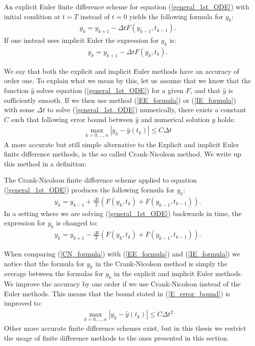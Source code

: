 \begin{definition} \label{Euler_adjoint_def}
An explicit Euler finite difference scheme for equation (\ref{general_1st_ODE}) with initial condition at $t=T$ instead of $t=0$ yields the following formula for $y_k$:
\begin{align}
y_k = y_{k+1} -\Delta tF(y_{k-1},t_{k-1}).\label{EE_adjoint_formula}
\end{align} 
If one instead uses implicit Euler the expression for $y_k$ is:
\begin{align}
y_k = y_{k+1} -\Delta tF(y_{k},t_{k}). \label{IE_adjoint_formula}
\end{align}
\end{definition}
\noindent
We say that both the explicit and implicit Euler methods have an accuracy of order one. To explain what we mean by this, let us assume that we know that the function $\hat y$ solves equation (\ref{general_1st_ODE}) for a given $F$, and that $\hat y$ is sufficiently smooth. If we then use method (\ref{EE_formula}) or (\ref{IE_formula}) with some $\Delta t$ to solve (\ref{general_1st_ODE}) numerically, there exists a constant $C$ such that following error bound between $\hat{y}$ and numerical solution $y$ holds:
\begin{align}
\max_{k=0,...,n}|y_k-\hat y(t_k)|\leq C\Delta t \label{E_error_bound}
\end{align}
A more accurate but still simple alternative to the Explicit and implicit Euler finite difference methods, is the so called Crank-Nicolson method\cite{crank1947practical}. We write up this method in a definition:
\begin{definition}
The Crank-Nicolson finite difference scheme applied to equation (\ref{general_1st_ODE}) produces the following formula for $y_k$:
\begin{align}
y_k = y_{k-1} +\frac{\Delta t}{2}(F(y_{k},t_{k})+F(y_{k-1},t_{k-1})). \label{CN_formula}
\end{align}
In a setting where we are solving (\ref{general_1st_ODE}) backwards in time, the expression for $y_k$ is changed to: 
\begin{align}
y_k = y_{k+1} -\frac{\Delta t}{2}(F(y_{k},t_{k})+F(y_{k-1},t_{k-1})). \label{CN_adjoint_formula}
\end{align}
\end{definition}
\noindent
When comparing (\ref{CN_formula}) with (\ref{EE_formula}) and (\ref{IE_formula}) we notice that the formula for $y_k$ in the Crank-Nicolson method is simply the average between the formulas for $y_k$ in the explicit and implicit Euler methods. We improve the accuracy by one order if we use Crank-Nicolson instead of the Euler methods. This means that the bound stated in (\ref{E_error_bound}) is improved to:
\begin{align}
\max_{k=0,...,n}|y_k-\hat y(t_k)|\leq C\Delta t^2 \label{CN_error_bound}
\end{align}
Other more accurate finite difference schemes exist, but in this thesis we restrict the usage of finite difference methods to the ones presented in this section. 
